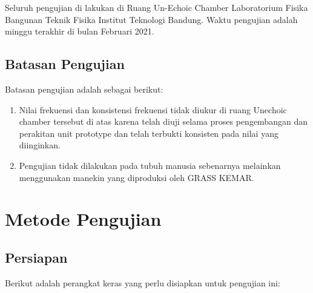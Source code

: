 \documentclass[12pt,]{article}
\begin{document}
	Seluruh pengujian di lakukan di Ruang Un-Echoic Chamber Laboratorium Fisika Bangunan Teknik Fisika
	Institut Teknologi Bandung. Waktu pengujian adalah minggu terakhir di bulan Februari 2021.

	\subsection{Batasan Pengujian}

	Batasan pengujian adalah sebagai berikut:

	\begin{enumerate}
		\item Nilai frekuensi dan konsistensi frekuensi tidak diukur di ruang Unechoic chamber tersebut di atas
		karena telah diuji selama proses pengembangan dan perakitan unit prototype dan telah terbukti konsisten pada nilai yang diinginkan.

		\item Pengujian tidak dilakukan pada tubuh manusia sebenarnya melainkan menggunakan manekin yang diproduksi oleh GRASS KEMAR.
	\end{enumerate}


	\newpage
	\section{Metode Pengujian}

	\subsection{Persiapan}

	Berikut adalah perangkat keras yang perlu disiapkan untuk pengujian ini:
\end{document}

